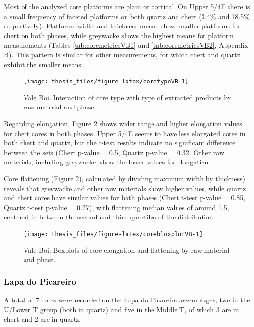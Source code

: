 \documentclass[12pt,twoside]{reedthesis}
\begin{document}
Most of the analyzed core platforms are plain or cortical. On Upper 5/4E there is a small frequency of faceted platforms on both quartz and chert (3.4\% and 18.5\% respectively). Platforms width and thickness means show smaller platforms for chert on both phases, while greywacke shows the highest means for platform measurements (Tables \ref{tab:coremetricsVB1} and \ref{tab:coremetricsVB2}, Appendix B). This pattern is similar for other measurements, for which chert and quartz exhibit the smaller means.
\begin{figure}[H]

{\centering \texttt{[image: thesis\_files/figure-latex/coretypeVB-1]} 

}

\caption{Vale Boi. Interaction of core type with type of extracted products by raw material and phase.}\label{fig:coretypeVB}
\end{figure}
Regarding elongation, Figure \ref{fig:corebloxplotVB} shows wider range and higher elongation values for chert cores in both phases. Upper 5/4E seems to have less elongated cores in both chert and quartz, but the t-test results indicate no significant difference between the sets (Chert p-value = 0.5, Quartz p-value = 0.32. Other raw materials, including greywacke, show the lower values for elongation.

Core flattening (Figure \ref{fig:corebloxplotVB}), calculated by dividing maximum width by thickness) reveals that greywacke and other raw materials show higher values, while quartz and chert cores have similar values for both phases (Chert t-test p-value = 0.85, Quartz t-test p-value = 0.27), with flattening median values of around 1.5, centered in between the second and third quartiles of the distribution.
\begin{figure}

{\centering \texttt{[image: thesis\_files/figure-latex/corebloxplotVB-1]} 

}

\caption{Vale Boi. Boxplots of core elongation and flattening by raw material and phase.}\label{fig:corebloxplotVB}
\end{figure}
\hypertarget{lapa-do-picareiro-4}{%
\subsubsection{Lapa do Picareiro}\label{lapa-do-picareiro-4}}

A total of 7 cores were recorded on the Lapa do Picareiro assemblages, two in the U/Lower T group (both in quartz) and five in the Middle T, of which 3 are in chert and 2 are in quartz.
\end{document}
